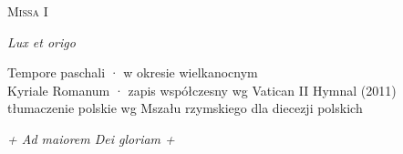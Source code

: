 



\begin{center}
  {\Huge\scshape Missa I}\par\smallskip
  {\Large\itshape Lux et origo}\par\smallskip
  {\small Tempore paschali · w okresie wielkanocnym\\
   Kyriale Romanum · zapis współczesny wg Vatican II Hymnal (2011)\\
   tłumaczenie polskie wg Mszału rzymskiego dla diecezji polskich}
\end{center}



\clearpage




\vfill
{\centering\itshape + Ad maiorem Dei gloriam +\par}


